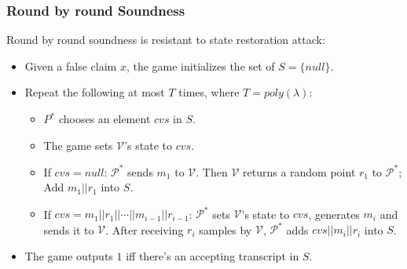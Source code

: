 \documentclass[UFT8]{beamer}
\begin{document}
\begin{frame}
    \frametitle{Round by round Soundness}
    Round by round soundness is resistant to state restoration attack:
    \begin{itemize}
        \item Given a false claim $x$, the game initializes the set of $S = \{ null \}$.
        \item Repeat the following at most $T$ times, where $T = poly(\lambda)$:
        \begin{itemize}
            \item $P^*$ chooses an element $cvs$ in $S$.
            \item The game sets $\mathcal{V}$'s state to $cvs$.
            \item If $cvs = null$: $\mathcal{P}^*$ sends $m_1$ to $\mathcal{V}$. 
            Then $\mathcal{V}$ returns a random point $r_1$ to $\mathcal{P}^*$;
            Add $m_1 || r_1$ into $S$.
            \item If $cvs = m_1 || r_1 || \cdots || m_{i-1} || r_{i-1}$: $\mathcal{P}^*$ sets $\mathcal{V}$'s state to $cvs$, generates $m_i$ and sends it to $\mathcal{V}$. 
            After receiving $r_i$ samples by $\mathcal{V}$, $\mathcal{P}^*$ adds $cvs || m_i || r_i$ into $S$.
        \end{itemize}
        \item The game outputs $1$ iff there's an accepting transcript in $S$.
    \end{itemize}
\end{frame}
\end{document}
